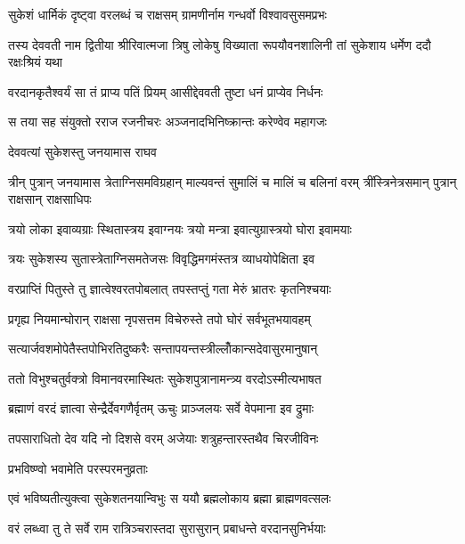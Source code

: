 
\twolineshloka
{सुकेशं धार्मिकं दृष्ट्वा वरलब्धं च राक्षसम्}
{ग्रामणीर्नाम गन्धर्वो विश्वावसुसमप्रभः} %

\threelineshloka
{तस्य देववती नाम द्वितीया श्रीरिवात्मजा}
{त्रिषु लोकेषु विख्याता रूपयौवनशालिनी}
{तां सुकेशाय धर्मेण ददौ रक्षःश्रियं यथा} %

\twolineshloka
{वरदानकृतैश्वर्यं सा तं प्राप्य पतिं प्रियम्}
{आसीद्देववती तुष्टा धनं प्राप्येव निर्धनः} %

\twolineshloka
{स तया सह संयुक्तो रराज रजनीचरः}
{अञ्जनादभिनिष्क्रान्तः करेण्वेव महागजः} %

\onelineshloka
{देववत्यां सुकेशस्तु जनयामास राघव} %

\threelineshloka
{त्रीन् पुत्रान् जनयामास त्रेताग्निसमविग्रहान्}
{माल्यवन्तं सुमालिं च मालिं च बलिनां वरम्}
{त्रींस्त्रिनेत्रसमान् पुत्रान् राक्षसान् राक्षसाधिपः} %

\twolineshloka
{त्रयो लोका इवाव्यग्राः स्थितास्त्रय इवाग्नयः}
{त्रयो मन्त्रा इवात्युग्रास्त्रयो घोरा इवामयाः} %

\twolineshloka
{त्रयः सुकेशस्य सुतास्त्रेताग्निसमतेजसः}
{विवृद्धिमगमंस्तत्र व्याधयोपेक्षिता इव} %

\twolineshloka
{वरप्राप्तिं पितुस्ते तु ज्ञात्वेश्वरतपोबलात्}
{तपस्तप्तुं गता मेरुं भ्रातरः कृतनिश्चयाः} %

\twolineshloka
{प्रगृह्य नियमान्घोरान् राक्षसा नृपसत्तम}
{विचेरुस्ते तपो घोरं सर्वभूतभयावहम्} %

\twolineshloka
{सत्यार्जवशमोपेतैस्तपोभिरतिदुष्करैः}
{सन्तापयन्तस्त्रील्लोँकान्सदेवासुरमानुषान्} %

\twolineshloka
{ततो विभुश्चतुर्वक्त्रो विमानवरमास्थितः}
{सुकेशपुत्रानामन्त्र्य वरदोऽस्मीत्यभाषत} %

\twolineshloka
{ब्रह्माणं वरदं ज्ञात्वा सेन्द्रैर्देवगणैर्वृतम्}
{ऊचुः प्राञ्जलयः सर्वे वेपमाना इव द्रुमाः} %

\twolineshloka
{तपसाराधितो देव यदि नो दिशसे वरम्}
{अजेयाः शत्रुहन्तारस्तथैव चिरजीविनः} %

\onelineshloka
{प्रभविष्ण्वो भवामेति परस्परमनुव्रताः} %

\twolineshloka
{एवं भविष्यतीत्युक्त्वा सुकेशतनयान्विभुः}
{स ययौ ब्रह्मलोकाय ब्रह्मा ब्राह्मणवत्सलः} %

\twolineshloka
{वरं लब्ध्वा तु ते सर्वे राम रात्रिञ्चरास्तदा}
{सुरासुरान् प्रबाधन्ते वरदानसुनिर्भयाः} %

